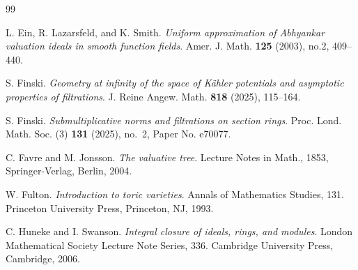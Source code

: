 \documentclass[11pt, leqno]{amsart}%
\theoremstyle{plain}
\theoremstyle{definition}
\theoremstyle{remark}
\numberwithin{equation}{section}
\begin{document}
\begin{thebibliography}{99}
	
     L. Ein, R. Lazarsfeld, and K. Smith. \emph{Uniform approximation of {A}bhyankar valuation ideals in smooth function fields}.
    Amer. J. Math. \textbf{125} (2003), no.2, 409--440.


     S. Finski. \emph{Geometry at infinity of the space of K\"ahler potentials and asymptotic properties of filtrations}. 
    J. Reine Angew. Math. {\bf 818} (2025), 115--164.

    
     S. Finski. \emph{Submultiplicative norms and filtrations on section rings}. 
    Proc. Lond. Math. Soc. (3) {\bf 131} (2025), no.~2, Paper No. e70077.
	
     C. Favre and M. Jonsson. \emph{The valuative tree}.
    Lecture Notes in Math., 1853, Springer-Verlag, Berlin, 2004.

     W. Fulton. \emph{Introduction to toric varieties}. 
    Annals of Mathematics Studies, 131. Princeton University Press, Princeton, NJ, 1993.
	
	
	
	
	
	

    
	
	
	
     C. Huneke and I. Swanson. \emph{Integral closure of ideals, rings, and modules}.
    London Mathematical Society Lecture Note Series, 336. Cambridge University Press, Cambridge,  2006.
	
	

\end{thebibliography}
\end{document}
